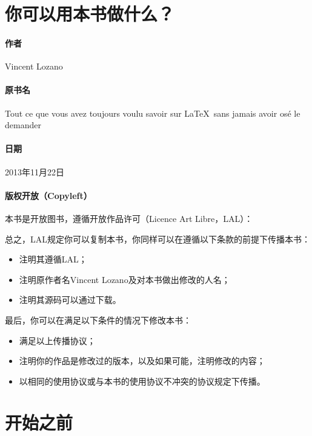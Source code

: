\section*{你可以用本书做什么？}

\paragraph*{作者}Vincent Lozano
\paragraph*{原书名}Tout ce que vous avez toujours voulu savoir sur \LaTeX \ sans jamais avoir osé le demander
\paragraph*{日期}2013年11月22日
\paragraph*{版权开放（Copyleft）}本书是开放图书，遵循开放作品许可（Licence Art Libre，LAL）：


总之，LAL规定你可以复制本书，你同样可以在遵循以下条款的前提下传播本书：

\begin{itemize}
    \item 注明其遵循LAL；
    \item 注明原作者名Vincent Lozano及对本书做出修改的人名；
    \item 注明其源码可以通过下载。
\end{itemize}

最后，你可以在满足以下条件的情况下修改本书：

\begin{itemize}
    \item 满足以上传播协议；
    \item 注明你的作品是修改过的版本，以及如果可能，注明修改的内容；
    \item 以相同的使用协议或与本书的使用协议不冲突的协议规定下传播。
\end{itemize}

\section*{开始之前}

